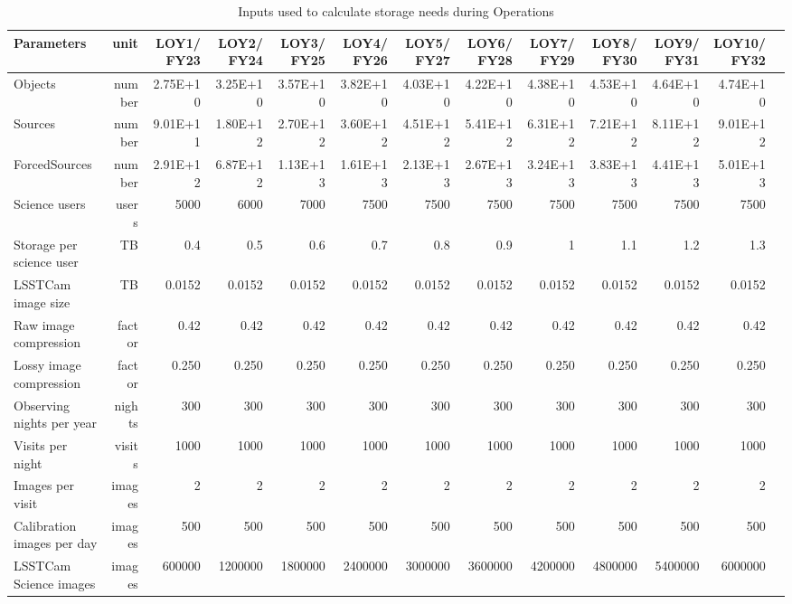 \tiny \begin{longtable} { |p{}  |r  |r  |r  |r  |r  |r  |r  |r  |r  |r  |r  |r |} 
\caption{Inputs used to calculate storage needs during Operations \label{tab:storageSizingOps}}\\ 
\hline 
\textbf{Parameters}&\textbf{unit}&\textbf{LOY1/ FY23}&\textbf{LOY2/ FY24}&\textbf{LOY3/ FY25}&\textbf{LOY4/ FY26}&\textbf{LOY5/ FY27}&\textbf{LOY6/ FY28}&\textbf{LOY7/ FY29}&\textbf{LOY8/ FY30}&\textbf{LOY9/ FY31}&\textbf{LOY10/ FY32} \\ \hline
{Objects}&{number}&{2.75E+10}&{3.25E+10}&{3.57E+10}&{3.82E+10}&{4.03E+10}&{4.22E+10}&{4.38E+10}&{4.53E+10}&{4.64E+10}&{4.74E+10} \\ \hline
{Sources}&{number}&{9.01E+11}&{1.80E+12}&{2.70E+12}&{3.60E+12}&{4.51E+12}&{5.41E+12}&{6.31E+12}&{7.21E+12}&{8.11E+12}&{9.01E+12} \\ \hline
{ForcedSources}&{number}&{2.91E+12}&{6.87E+12}&{1.13E+13}&{1.61E+13}&{2.13E+13}&{2.67E+13}&{3.24E+13}&{3.83E+13}&{4.41E+13}&{5.01E+13} \\ \hline
{Science users}&{users}&{5000}&{6000}&{7000}&{7500}&{7500}&{7500}&{7500}&{7500}&{7500}&{7500} \\ \hline
{Storage per science user}&{TB}&{0.4}&{0.5}&{0.6}&{0.7}&{0.8}&{0.9}&{1}&{1.1}&{1.2}&{1.3} \\ \hline
{LSSTCam image size}&{TB}&{0.0152}&{0.0152}&{0.0152}&{0.0152}&{0.0152}&{0.0152}&{0.0152}&{0.0152}&{0.0152}&{0.0152} \\ \hline
{Raw image compression}&{factor}&{0.42}&{0.42}&{0.42}&{0.42}&{0.42}&{0.42}&{0.42}&{0.42}&{0.42}&{0.42} \\ \hline
{Lossy image compression}&{factor}&{0.250}&{0.250}&{0.250}&{0.250}&{0.250}&{0.250}&{0.250}&{0.250}&{0.250}&{0.250} \\ \hline
{Observing nights per year}&{nights}&{300}&{300}&{300}&{300}&{300}&{300}&{300}&{300}&{300}&{300} \\ \hline
{Visits per night}&{visits}&{1000}&{1000}&{1000}&{1000}&{1000}&{1000}&{1000}&{1000}&{1000}&{1000} \\ \hline
{Images per visit}&{images}&{2}&{2}&{2}&{2}&{2}&{2}&{2}&{2}&{2}&{2} \\ \hline
{Calibration images per day}&{images}&{500}&{500}&{500}&{500}&{500}&{500}&{500}&{500}&{500}&{500} \\ \hline
{LSSTCam Science images}&{images}&{600000}&{1200000}&{1800000}&{2400000}&{3000000}&{3600000}&{4200000}&{4800000}&{5400000}&{6000000} \\ \hline

\end{longtable}
